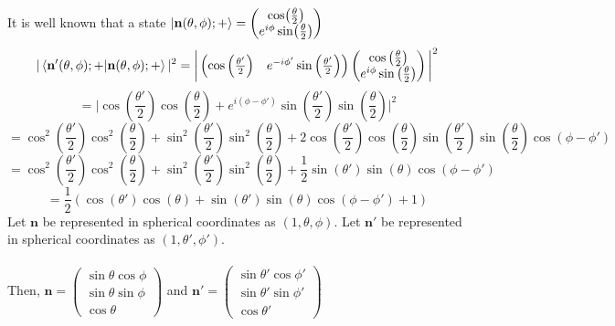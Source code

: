\begin{sol}
It is well known that a state $\ket{\mathbf{n}(\theta,\phi);+}=\begin{pmatrix}\cos(\frac{\theta}{2})\\e^{i\phi}\sin(\frac{\theta}{2})\end{pmatrix}$ \\
\begin{equation}
	|\braket{\mathbf{n'}(\theta,\phi);+}{\mathbf{n}(\theta,\phi);+}|^2=\bigg|\begin{pmatrix}\cos\left(\frac{\theta'}{2}\right)&e^{-i\phi'}\sin\left(\frac{\theta'}{2}\right)\end{pmatrix}\begin{pmatrix}\cos\left(\frac{\theta}{2}\right)\\e^{i\phi}\sin\left(\frac{\theta}{2}\right)\end{pmatrix}\bigg|^2
\end{equation}
\begin{equation}
	=\bigg|\cos\left(\frac{\theta'}{2}\right)\cos\left(\frac{\theta}{2}\right)+e^{i(\phi-\phi')}\sin\left(\frac{\theta'}{2}\right)\sin\left(\frac{\theta}{2}\right)\bigg|^2
\end{equation}
\begin{equation}
	=\cos^2\left(\frac{\theta'}{2}\right)\cos^2\left(\frac{\theta}{2}\right)+\sin^2\left(\frac{\theta'}{2}\right)\sin^2\left(\frac{\theta}{2}\right)+2\cos\left(\frac{\theta'}{2}\right)\cos\left(\frac{\theta}{2}\right)\sin\left(\frac{\theta'}{2}\right)\sin\left(\frac{\theta}{2}\right)\cos(\phi-\phi')
\end{equation} 
\begin{equation}
	=\cos^2\left(\frac{\theta'}{2}\right)\cos^2\left(\frac{\theta}{2}\right)+\sin^2\left(\frac{\theta'}{2}\right)\sin^2\left(\frac{\theta}{2}\right)+\frac{1}{2}\sin\left(\theta'\right)\sin\left(\theta\right)\cos(\phi-\phi')
\end{equation}
\begin{equation}
	=\frac{1}{2}(\cos(\theta')\cos(\theta)+\sin(\theta')\sin(\theta)\cos(\phi-\phi')+1)
\end{equation} 
Let $\mathbf{n}$ be represented in spherical coordinates as $(1,\theta,\phi)$. Let $\mathbf{n'}$ be represented in spherical coordinates as $(1,\theta',\phi')$.\\\\
Then, $\mathbf{n}=\begin{pmatrix}\sin\theta\cos\phi\\\sin\theta\sin\phi\\\cos\theta\end{pmatrix}$ and $\mathbf{n'}=\begin{pmatrix}\sin\theta'\cos\phi'\\\sin\theta'\sin\phi'\\\cos\theta'\end{pmatrix}$

\end{sol}
